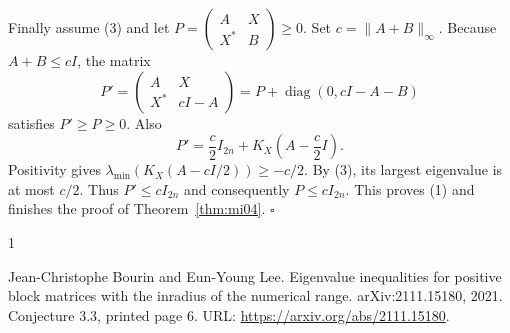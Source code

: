 \documentclass[10pt,a4paper]{article}
\theoremstyle{remark}
\newcommand{\diag}{\operatorname{diag}}
\newcommand{\opnorm}[1]{\lVert #1\rVert_{\infty}}
\begin{document}
Finally assume (3) and let
$P=\begin{pmatrix}A&X\\X^*&B\end{pmatrix}\geq0$.
Set $c=\opnorm{A+B}$. Because $A+B\leq cI$, the matrix
\[
 P'=\begin{pmatrix}A&X\\X^*&cI-A\end{pmatrix}
 =P+\diag(0,cI-A-B)
\]
satisfies $P'\geq P\geq0$. Also
\[
 P'=\frac c2I_{2n}+K_X\left(A-\frac c2I\right).
\]
Positivity gives $\lambda_{\min}(K_X(A-cI/2))\geq-c/2$. By (3), its largest eigenvalue is at most $c/2$. Thus $P'\leq cI_{2n}$ and consequently $P\leq cI_{2n}$. This proves (1) and finishes the proof of Theorem~\ref{thm:mi04}.
\hfill$\square$

\begin{thebibliography}{1}

Jean-Christophe Bourin and Eun-Young Lee.
\newblock Eigenvalue inequalities for positive block matrices with the inradius
  of the numerical range.
\newblock arXiv:2111.15180, 2021.
\newblock Conjecture 3.3, printed page 6.
\newblock URL: \url{https://arxiv.org/abs/2111.15180}.

\end{thebibliography}
\end{document}
